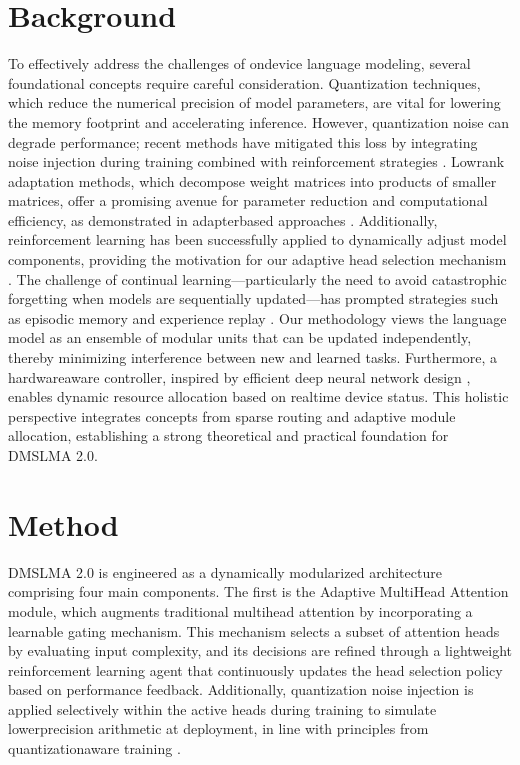 \documentclass{article} %
\begin{document}
\section{Background}
\label{sec:background}
To effectively address the challenges of on\-device language modeling, several foundational concepts require careful consideration. Quantization techniques, which reduce the numerical precision of model parameters, are vital for lowering the memory footprint and accelerating inference. However, quantization noise can degrade performance; recent methods have mitigated this loss by integrating noise injection during training combined with reinforcement strategies \cite{fan2020training}. Low\-rank adaptation methods, which decompose weight matrices into products of smaller matrices, offer a promising avenue for parameter reduction and computational efficiency, as demonstrated in adapter\-based approaches \cite{mahabadi2021compacter}. Additionally, reinforcement learning has been successfully applied to dynamically adjust model components, providing the motivation for our adaptive head selection mechanism \cite{zhang2022examining}. The challenge of continual learning—particularly the need to avoid catastrophic forgetting when models are sequentially updated—has prompted strategies such as episodic memory and experience replay \cite{sun2019lamol, chaudhry2018lifelong}. Our methodology views the language model as an ensemble of modular units that can be updated independently, thereby minimizing interference between new and learned tasks. Furthermore, a hardware\-aware controller, inspired by efficient deep neural network design \cite{li2022efficientformer}, enables dynamic resource allocation based on real\-time device status. This holistic perspective integrates concepts from sparse routing and adaptive module allocation, establishing a strong theoretical and practical foundation for DMS\-LMA 2.0.

\section{Method}
\label{sec:method}
DMS\-LMA 2.0 is engineered as a dynamically modularized architecture comprising four main components. The first is the Adaptive Multi\-Head Attention module, which augments traditional multi\-head attention by incorporating a learnable gating mechanism. This mechanism selects a subset of attention heads by evaluating input complexity, and its decisions are refined through a lightweight reinforcement learning agent that continuously updates the head selection policy based on performance feedback. Additionally, quantization noise injection is applied selectively within the active heads during training to simulate lower\-precision arithmetic at deployment, in line with principles from quantization\-aware training \cite{fan2020training}.
\end{document}
